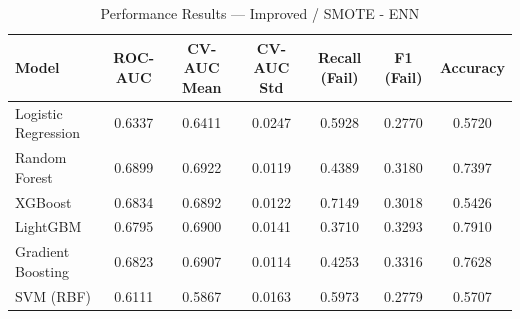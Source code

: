 \begin{table}[htbp]
\caption{Performance Results — Improved / SMOTE - ENN}
\label{tab:improved_smote_-_enn}
\begin{tabular}{lcccccc}
\toprule

Model & ROC-AUC & CV-AUC Mean & CV-AUC Std & Recall (Fail) & F1 (Fail) & Accuracy \\
\midrule

Logistic Regression & 0.6337 & 0.6411 & 0.0247 & 0.5928 & 0.2770 & 0.5720 \\
Random Forest & 0.6899 & 0.6922 & 0.0119 & 0.4389 & 0.3180 & 0.7397 \\
XGBoost & 0.6834 & 0.6892 & 0.0122 & 0.7149 & 0.3018 & 0.5426 \\
LightGBM & 0.6795 & 0.6900 & 0.0141 & 0.3710 & 0.3293 & 0.7910 \\
Gradient Boosting & 0.6823 & 0.6907 & 0.0114 & 0.4253 & 0.3316 & 0.7628 \\
SVM (RBF) & 0.6111 & 0.5867 & 0.0163 & 0.5973 & 0.2779 & 0.5707 \\
\bottomrule

\end{tabular}
\end{table}
